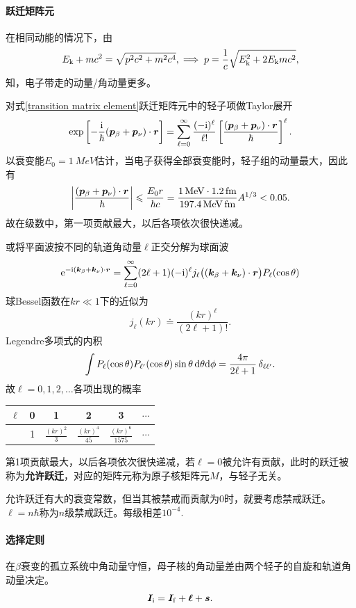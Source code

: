 \paragraph{跃迁矩阵元}在相同动能的情况下，由
\[
	E_{\mathrm k}+mc^2=\sqrt{p^2c^2+m^2c^4},\implies p=\frac1c\sqrt{E_{\mathrm k}^2+2E_{\mathrm k} mc^2},
\]
知，电子带走的动量/角动量更多。

对式\eqref{transition matrix element}跃迁矩阵元中的轻子项做Taylor展开
\begin{align*}
	\exp\left[-\frac{\mathrm{i}}\hbar(\bm p_\beta+\bm p_\nu)\cdot\bm r\right]=\sum_{\ell=0}^\infty\frac{(-\mathrm{i})^\ell}{\ell!}\left[\frac{(\bm p_\beta+\bm p_\nu)\cdot\bm r}\hbar\right]^\ell.
\end{align*}
以衰变能$E_0=\SI{1}{MeV}$估计，当电子获得全部衰变能时，轻子组的动量最大，因此有
\[
	\left\lvert\frac{(\bm p_\beta+\bm p_\nu)\cdot\bm r}\hbar\right\rvert\leqslant\frac{E_0r}{\hbar c}=\frac{\SI{1}{MeV}\cdot\SI{1.2}{fm}}{\SI{197.4}{MeV.fm}}A^{1/3}<0.05.
\]
故在级数中，第一项贡献最大，以后各项依次很快递减。

或将平面波按不同的轨道角动量$\ell$正交分解为球面波
\[
	\mathop{}\!\mathrm{e}^{-\mathrm{i}(\bm k_\beta+\bm k_\nu)\cdot\bm r}=\sum_{\ell=0}^\infty(2\ell+1)(-\mathrm{i})^\ell j_\ell\bigl((\bm k_\beta+\bm k_\nu)\cdot\bm r\bigr)P_\ell(\cos\theta)
\]
球Bessel函数在$kr\ll 1$下的近似为
\[
	j_\ell(kr)\doteq\frac{(kr)^\ell}{(2\ell+1)!}.
\]
Legendre多项式的内积
\[
	\int P_\ell(\cos\theta)P_{\ell'}(\cos\theta)\sin\theta\mathop{}\!\mathrm{d}\theta\mathrm{d}\phi=\frac{4\pi}{2\ell+1}\mathop{}\!\delta_{\ell\ell'}.
\]
故$\ell=0,1,2,\ldots$各项出现的概率
\begin{center}
	\begin{tabular}{cccccc}
		\toprule
		$\ell$&0&1&2&3&$\cdots$\\
		\midrule
		&1&$\frac{(kr)^2}3$&$\frac{(kr)^4}{45}$&$\frac{(kr)^6}{1575}$&$\cdots$\\
		\bottomrule
	\end{tabular}
\end{center}
第1项贡献最大，以后各项依次很快递减，若$\ell=0$被允许有贡献，此时的跃迁被称为\textbf{允许跃迁}，对应的矩阵元称为原子核矩阵元$M$，与轻子无关。

允许跃迁有大的衰变常数，但当其被禁戒而贡献为0时，就要考虑禁戒跃迁。$\ell=n\hbar$称为$n$级禁戒跃迁。每级相差$10^{-4}.$
\paragraph{选择定则}在$\beta$衰变的孤立系统中角动量守恒，母子核的角动量差由两个轻子的自旋和轨道角动量决定。
\[
	\bm I_{\mathrm{i}}=\bm I_{\mathrm{f}}+\bm\ell+\bm s.
\]

